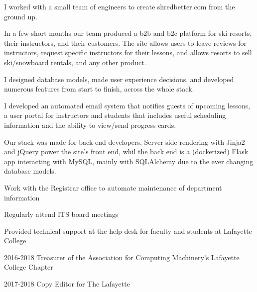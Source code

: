 \documentclass[letterpaper]{deedy-resume} %
\begin{document}
\begin{minipage}[t]{0.64\textwidth}
I worked with a small team of engineers to create shredbetter.com from the ground up.
\begin{tightitemize}
\item In a few short months our team produced a b2b and b2c platform for ski resorts, their instructors, and their customers. The site allows users to leave reviews for instructors, request specific instructors for their lessons, and allows resorts to sell ski/snowboard rentals, and any other product.
\item I designed database models, made user experience decisions, and developed numerous features from start to finish, across the whole stack. 
\item I developed an automated email system that notifies guests of upcoming lessons, a user portal for instructors and students that includes useful scheduling information and the ability to view/send progress cards.
\item Our stack was made for back-end developers. Server-side rendering with Jinja2 and jQuery power the site's front end, whil the back end is a (dockerized) Flask app interacting with MySQL, mainly with SQLAlchemy due to the ever changing database models.
\end{tightitemize}
\sectionspace
{}

\begin{tightitemize}
\item Work with the Registrar office to automate maintenance of department information
\item Regularly attend ITS board meetings
\item Provided technical support at the help desk for faculty and students at Lafayette College
\end{tightitemize}

\sectionspace

\sectionspace %



\sectionspace %



\begin{tightitemize}
\item 2016-2018 Treasurer of the Association for Computing Machinery's 
Lafayette College Chapter \\
\item 2017-2018 Copy Editor for The Lafayette 
\end{tightitemize}

\sectionspace
\end{minipage} %
\end{document}
